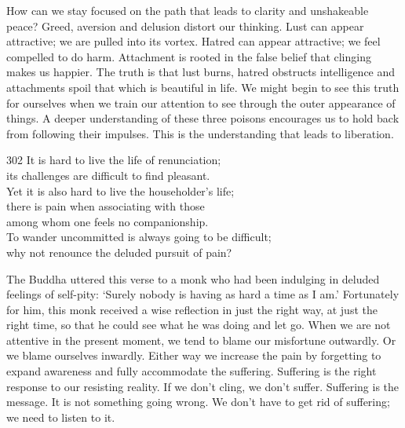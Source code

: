 \begin{dhpRefl}
How can we stay focused on the path that leads to clarity and unshakeable peace? Greed, aversion and delusion distort our thinking. Lust can appear attractive; we are pulled into its vortex. Hatred can appear attractive; we feel compelled to do harm. Attachment is rooted in the false belief that clinging makes us happier. The truth is that lust burns, hatred obstructs intelligence and attachments spoil that which is beautiful in life. We might begin to see this truth for ourselves when we train our attention to see through the outer appearance of things. A deeper understanding of these three poisons encourages us to hold back from following their impulses. This is the understanding that leads to liberation.
\end{dhpRefl}


\begin{dhpVerse}{302}
\label{dhp-302}
It is hard to live the life of renunciation;\\
its challenges are difficult to find pleasant.\\
Yet it is also hard to live the householder's life;\\
there is pain when associating with those\\
among whom one feels no companionship.\\
To wander uncommitted is always going to be difficult;\\
why not renounce the deluded pursuit of pain?
\end{dhpVerse}

\begin{dhpRefl}
The Buddha uttered this verse to a monk who had been indulging in deluded feelings of self-pity: `Surely nobody is having as hard a time as I am.' Fortunately for him, this monk received a wise reflection in just the right way, at just the right time, so that he could see what he was doing and let go. When we are not attentive in the present moment, we tend to blame our misfortune outwardly. Or we blame ourselves inwardly. Either way we increase the pain by forgetting to expand awareness and fully accommodate the suffering. Suffering is the right response to our resisting reality. If we don't cling, we don't suffer. Suffering is the message. It is not something going wrong. We don't have to get rid of suffering; we need to listen to it.
\end{dhpRefl}


